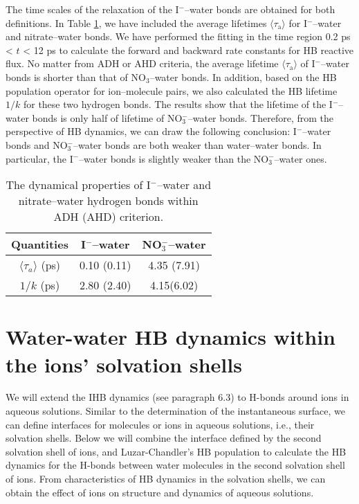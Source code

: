 The time scales of the relaxation of the I$^-$--water bonds are obtained for both definitions. 
In Table \ref{tab:properties_anion-water_hbs}, we have included the average lifetimes $\langle\tau_\text{a}\rangle$ for I$^-$--water and nitrate--water bonds. 
We have performed the fitting in the time region 0.2 ps < $t$ < 12 ps to calculate the forward and backward rate constants for HB reactive flux.
No matter from ADH or AHD criteria, the average lifetime $\langle\tau_\text{a}\rangle$ of I$^-$--water bonds is shorter than that of NO$_3$--water bonds.
In addition, based on the HB population operator for ion--molecule pairs, we also calculated the HB lifetime $1/k$ for these two hydrogen bonds. 
The results show that the lifetime of the I$^-$--water bonds is only half of lifetime of NO$_3^-$--water bonds. Therefore, from the perspective of HB dynamics,
we can draw the following conclusion: I$^-$--water bonds and NO$_3^-$--water bonds are both weaker than water--water bonds. In particular, 
the I$^-$--water bonds is slightly weaker than the NO$_3^-$--water ones.
\begin{table}[htbp]
\centering
\caption{ 
    The dynamical properties of I$^-$--water and nitrate--water hydrogen bonds within ADH (AHD) criterion.} 
\begin{tabular}{ccc}
\label{tab:properties_anion-water_hbs}
 Quantities  & I$^-$--water & NO$_3^-$--water \\
\hline
  $\langle\tau_a\rangle$ (ps) & 0.10 (0.11) & 4.35 (7.91) \\
  $1/k$ (ps) & 2.80 (2.40) & 4.15(6.02) \\
\end{tabular} %
\end{table}

\FloatBarrier
\section{Water-water HB dynamics within the ions' solvation shells} \label{PARA_SHBD}
We will extend the IHB dynamics (see paragraph 6.3) to H-bonds around ions in aqueous solutions. 
Similar to the determination of the instantaneous surface, we can define interfaces for molecules or ions in aqueous solutions, i.e., 
their solvation shells. 
Below we will combine the interface defined by the second solvation shell of ions, 
and Luzar-Chandler's HB population \cite{AL96} to calculate the HB
dynamics for the H-bonds between water molecules in the second solvation shell of ions.
From characteristics of HB dynamics in the solvation shells, we can obtain the effect of ions on structure and dynamics of aqueous solutions. 

